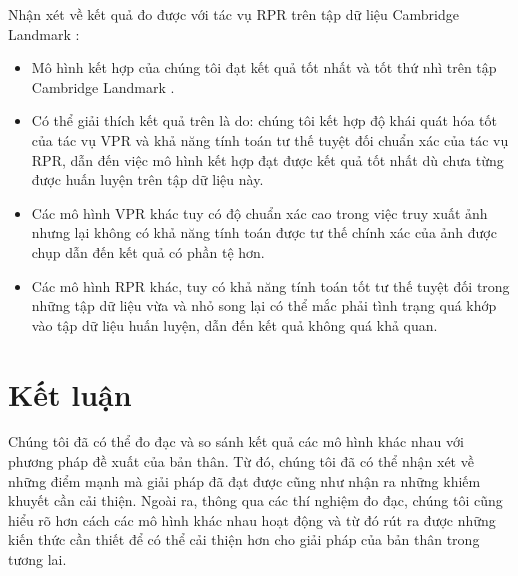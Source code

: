 Nhận xét về kết quả đo được với tác vụ RPR trên tập dữ liệu Cambridge Landmark \cite{kendall2016posenet}:
\begin{itemize}
	\item Mô hình kết hợp của chúng tôi đạt kết quả tốt nhất và tốt thứ nhì trên tập Cambridge Landmark \cite{kendall2016posenet}.
	\item Có thể giải thích kết quả trên là do: chúng tôi kết hợp độ khái quát hóa tốt của tác vụ VPR và khả năng tính toán tư thế tuyệt đối chuẩn xác của tác vụ RPR, dẫn đến việc mô hình kết hợp đạt được kết quả tốt nhất dù chưa từng được huấn luyện trên tập dữ liệu này. 
	\item Các mô hình VPR khác tuy có độ chuẩn xác cao trong việc truy xuất ảnh nhưng lại không có khả năng tính toán được tư thế chính xác của ảnh được chụp dẫn đến kết quả có phần tệ hơn.
	\item Các mô hình RPR khác, tuy có khả năng tính toán tốt tư thế tuyệt đối trong những tập dữ liệu vừa và nhỏ song lại có thể mắc phải tình trạng quá khớp vào tập dữ liệu huấn luyện, dẫn đến kết quả không quá khả quan.
\end{itemize}


\section{Kết luận}
Chúng tôi đã có thể đo đạc và so sánh kết quả các mô hình khác nhau với phương pháp đề xuất của bản thân. Từ đó, chúng tôi đã có thể nhận xét về những điểm mạnh mà giải pháp đã đạt được cũng như nhận ra những khiếm khuyết cần cải thiện. Ngoài ra, thông qua các thí nghiệm đo đạc, chúng tôi cũng hiểu rõ hơn cách các mô hình khác nhau hoạt động và từ đó rút ra được những kiến thức cần thiết để có thể cải thiện hơn cho giải pháp của bản thân trong tương lai.